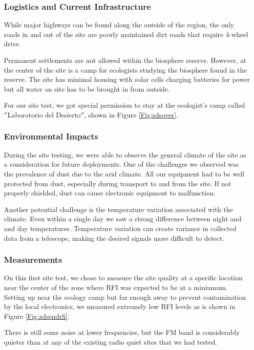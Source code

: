 \subsubsection{Logistics and Current Infrastructure}
While major highways can be found along the outside of the region, the only roads in and out of the site are poorly maintained dirt roads that require 4-wheel drive.

Permanent settlements are not allowed within the biosphere reserve. However, at the center of the site is a camp for ecologists studying the biosphere found in the reserve. The site has minimal housing with solar cells charging batteries for power but all water on site has to be brought in from outside. 

For our site test, we got special permission to stay at the ecologist's camp called $''$Laboratorio del Desierto$''$, shown in Figure \ref{Fig:zdsover}.

\subsubsection{Environmental Impacts}

During the site testing, we were able to observe the general climate of the site as a consideration for future deployments. One of the challenges we observed was the prevalence of dust due to the arid climate. All our equipment had to be well protected from dust, especially during transport to and from the site. If not properly shielded, dust can cause electronic equipment to malfunction. 

Another potential challenge is the temperature variation associated with the climate. Even within a single day we saw a strong difference between night and and day temperatures. Temperature variation can create variance in collected data from a telescope, making the desired signals more difficult to detect. 

\subsubsection{Measurements}

On this first site test, we chose to measure the site quality at a specific location near the center of the zone where RFI was expected to be at a miniumum. Setting up near the ecology camp but far enough away to prevent contamination by the local electronics, we measured extremely low RFI levels as is shown in Figure \ref{Fig:zdsendrfi}.

There is still some noise at lower frequencies, but the FM band is considerably quieter than at any of the existing radio quiet sites that we had tested. 

